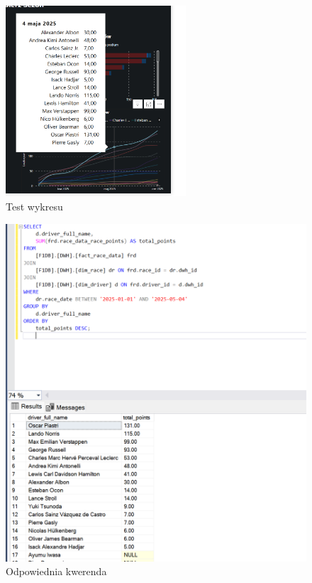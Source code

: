 \documentclass[12pt]{article}
\begin{document}
\begin{figure}[H]
    \centering   \includegraphics[width=0.6\textwidth]{t4.png}
    \caption{Test wykresu}
\end{figure}

\begin{figure}[H]
    \centering   \includegraphics[width=\textwidth]{t5.png}
    \caption{Odpowiednia kwerenda}
\end{figure}
\end{document}
